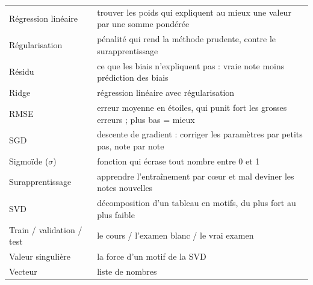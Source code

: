 \documentclass[11pt,a4paper]{article}
\begin{document}
\begin{center}
\begin{tabularx}{\linewidth}{@{}lX@{}}
Régression linéaire & trouver les poids qui expliquent au mieux une valeur par une somme pondérée \\
Régularisation & pénalité qui rend la méthode prudente, contre le surapprentissage \\
Résidu & ce que les biais n'expliquent pas : vraie note moins prédiction des biais \\
Ridge & régression linéaire avec régularisation \\
RMSE & erreur moyenne en étoiles, qui punit fort les grosses erreurs ; plus bas = mieux \\
SGD & descente de gradient : corriger les paramètres par petits pas, note par note \\
Sigmoïde ($\sigma$) & fonction qui écrase tout nombre entre 0 et 1 \\
Surapprentissage & apprendre l'entraînement par c\oe ur et mal deviner les notes nouvelles \\
SVD & décomposition d'un tableau en motifs, du plus fort au plus faible \\
Train / validation / test & le cours / l'examen blanc / le vrai examen \\
Valeur singulière & la force d'un motif de la SVD \\
Vecteur & liste de nombres \\
\bottomrule
\end{tabularx}
\end{center}
\end{document}
